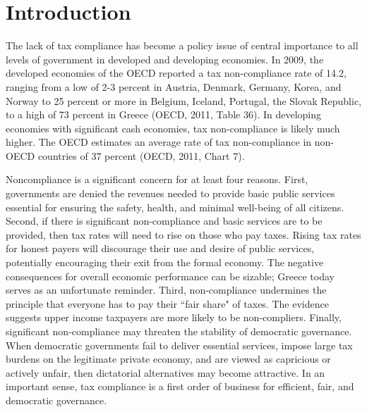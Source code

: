 \documentclass[12pt,titlepage]{article}
\begin{document}
\section{Introduction}

The lack of tax compliance has become a policy issue of central
importance to all levels of government in developed and developing
economies. In 2009, the developed economies of the OECD reported a tax
non-compliance rate of 14.2, ranging from a low of 2-3 percent in
Austria, Denmark, Germany, Korea, and Norway to 25 percent or more in
Belgium, Iceland, Portugal, the Slovak Republic, to a high of 73
percent in Greece (OECD, 2011, Table 36). In developing economies with
significant cash economies, tax non-compliance is likely much higher. The
OECD estimates an average rate of tax non-compliance in non-OECD
countries of 37 percent (OECD, 2011, Chart 7).

Noncompliance is a significant concern for at least four reasons.
First, governments are denied the revenues needed to provide basic
public services essential for ensuring the safety, health, and minimal
well-being of all citizens.  Second, if there is significant
non-compliance and basic services are to be provided, then tax rates
will need to rise on those who pay taxes. Rising tax rates for honest
payers will discourage their use and desire of public services,
potentially encouraging their exit from the formal economy. The
negative consequences for overall economic performance can be sizable;
Greece today serves as an unfortunate reminder.  Third, non-compliance
undermines the principle that everyone has to pay their ``fair share"
of taxes.  The evidence suggests upper income taxpayers are more
likely to be non-compliers.  Finally, significant non-compliance may
threaten the stability of democratic governance.  When democratic
governments fail to deliver essential services, impose large tax
burdens on the legitimate private economy, and are viewed as
capricious or actively unfair, then dictatorial alternatives may
become attractive. In an important sense, tax compliance is a first
order of business for efficient, fair, and democratic governance.
\end{document}
